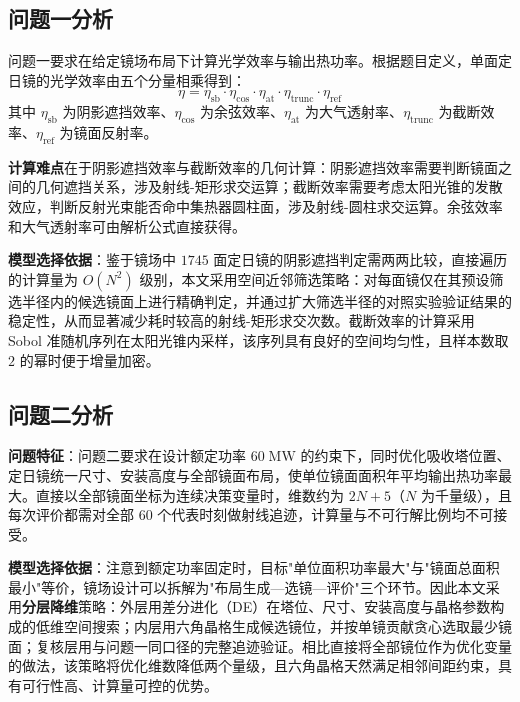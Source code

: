 \documentclass[12pt,a4paper,fontset=fandol]{ctexart}
\begin{document}
\subsection{问题一分析}

问题一要求在给定镜场布局下计算光学效率与输出热功率。根据题目定义，单面定日镜的光学效率由五个分量相乘得到：
\begin{equation}
    \eta = \eta_{\mathrm{sb}} \cdot \eta_{\mathrm{cos}} \cdot \eta_{\mathrm{at}} \cdot \eta_{\mathrm{trunc}} \cdot \eta_{\mathrm{ref}}
    \label{eq:eta_decomp}
\end{equation}
其中 $\eta_{\mathrm{sb}}$ 为阴影遮挡效率、$\eta_{\mathrm{cos}}$ 为余弦效率、$\eta_{\mathrm{at}}$ 为大气透射率、$\eta_{\mathrm{trunc}}$ 为截断效率、$\eta_{\mathrm{ref}}$ 为镜面反射率。

\textbf{计算难点}在于阴影遮挡效率与截断效率的几何计算：阴影遮挡效率需要判断镜面之间的几何遮挡关系，涉及射线-矩形求交运算；截断效率需要考虑太阳光锥的发散效应，判断反射光束能否命中集热器圆柱面，涉及射线-圆柱求交运算。余弦效率和大气透射率可由解析公式直接获得。

\textbf{模型选择依据}：鉴于镜场中 $1745$ 面定日镜的阴影遮挡判定需两两比较，直接遍历的计算量为 $O(N^2)$ 级别，本文采用空间近邻筛选策略：对每面镜仅在其预设筛选半径内的候选镜面上进行精确判定，并通过扩大筛选半径的对照实验验证结果的稳定性，从而显著减少耗时较高的射线-矩形求交次数。截断效率的计算采用 Sobol 准随机序列在太阳光锥内采样，该序列具有良好的空间均匀性，且样本数取 $2$ 的幂时便于增量加密。

\subsection{问题二分析}

\textbf{问题特征}：问题二要求在设计额定功率 $60\;\mathrm{MW}$ 的约束下，同时优化吸收塔位置、定日镜统一尺寸、安装高度与全部镜面布局，使单位镜面面积年平均输出热功率最大。直接以全部镜面坐标为连续决策变量时，维数约为 $2N+5$（$N$ 为千量级），且每次评价都需对全部 $60$ 个代表时刻做射线追迹，计算量与不可行解比例均不可接受。

\textbf{模型选择依据}：注意到额定功率固定时，目标"单位面积功率最大"与"镜面总面积最小"等价，镜场设计可以拆解为"布局生成—选镜—评价"三个环节。因此本文采用\textbf{分层降维}策略：外层用差分进化（DE）在塔位、尺寸、安装高度与晶格参数构成的低维空间搜索；内层用六角晶格生成候选镜位，并按单镜贡献贪心选取最少镜面；复核层用与问题一同口径的完整追迹验证。相比直接将全部镜位作为优化变量的做法，该策略将优化维数降低两个量级，且六角晶格天然满足相邻间距约束，具有可行性高、计算量可控的优势。
\end{document}
